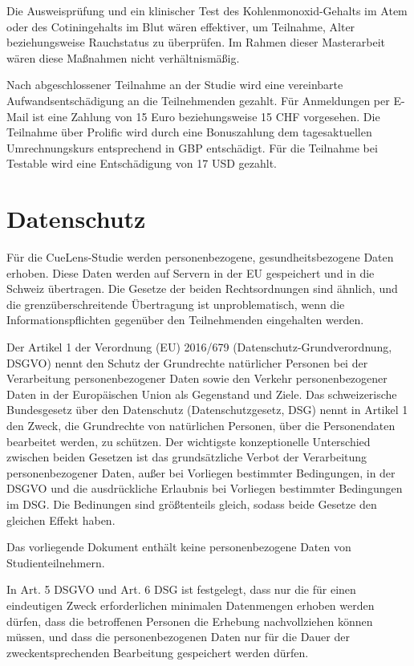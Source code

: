 Die Ausweisprüfung und ein klinischer Test des Kohlenmonoxid-Gehalts im Atem oder des Cotiningehalts im Blut wären effektiver, um Teilnahme, Alter beziehungsweise Rauchstatus zu überprüfen. Im Rahmen dieser Masterarbeit wären diese Maßnahmen nicht verhältnismäßig.
 
Nach abgeschlossener Teilnahme an der Studie wird eine vereinbarte Aufwandsentschädigung an die Teilnehmenden gezahlt. Für Anmeldungen per E-Mail ist eine Zahlung von 15 Euro beziehungsweise 15 CHF vorgesehen. Die Teilnahme über Prolific wird durch eine Bonuszahlung dem tagesaktuellen Umrechnungskurs entsprechend in GBP entschädigt. Für die Teilnahme bei Testable wird eine Entschädigung von 17 USD gezahlt.

\section{Datenschutz}
Für die CueLens-Studie werden personenbezogene, gesundheitsbezogene Daten erhoben. Diese Daten werden auf Servern in der EU gespeichert und in die Schweiz übertragen. Die Gesetze der beiden Rechtsordnungen sind ähnlich, und die grenzüberschreitende Übertragung ist unproblematisch, wenn die Informationspflichten gegenüber den Teilnehmenden eingehalten werden.

Der Artikel 1 der Verordnung (EU) 2016/679 (Datenschutz-Grundverordnung, DSGVO) nennt den Schutz der Grundrechte natürlicher Personen bei der Verarbeitung personenbezogener Daten sowie den Verkehr personenbezogener Daten in der Europäischen Union als Gegenstand und Ziele. Das schweizerische Bundesgesetz über den Datenschutz (Datenschutzgesetz, DSG) nennt in Artikel 1 den Zweck, die Grundrechte von natürlichen Personen, über die Personendaten bearbeitet werden, zu schützen. Der wichtigste konzeptionelle Unterschied zwischen beiden Gesetzen ist das grundsätzliche Verbot der Verarbeitung personenbezogener Daten, außer bei Vorliegen bestimmter Bedingungen, in der DSGVO und die ausdrückliche Erlaubnis bei Vorliegen bestimmter Bedingungen im DSG. Die Bedinungen sind größtenteils gleich, sodass beide Gesetze den gleichen Effekt haben.

Das vorliegende Dokument enthält keine personenbezogene Daten von Studienteilnehmern.

In Art. 5 DSGVO und Art. 6 DSG ist festgelegt, dass nur die für einen eindeutigen Zweck erforderlichen minimalen Datenmengen erhoben werden dürfen, dass die betroffenen Personen die Erhebung nachvollziehen können müssen, und dass die personenbezogenen Daten nur für die Dauer der zweckentsprechenden Bearbeitung gespeichert werden dürfen. 

